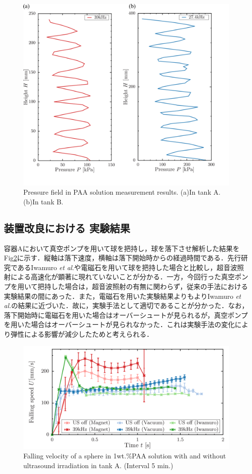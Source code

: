 \begin{figure}[ht]
    \centering
    \includegraphics[width=12cm,clip]{4-Results/press.png}
    \caption{Pressure field in PAA solution measurement results. (a)In tank A. (b)In tank B.}
    \label{fig:pressure}
\end{figure}

\newpage

\subsection{装置改良における 実験結果}

容器Aにおいて真空ポンプを用いて球を把持し，球を落下させ解析した結果をFig\ref{fig:falling-A}に示す．縦軸は落下速度，横軸は落下開始時からの経過時間である．先行研究であるIwamuro \textit{et al}.\cite{ref:8}や電磁石を用いて球を把持した場合と比較し，超音波照射による高速化が顕著に現れていないことが分かる．一方，今回行った真空ポンプを用いて把持した場合は，超音波照射の有無に関わらず，従来の手法における実験結果の間にあった．また，電磁石を用いた実験結果よりもよりIwamuro \textit{et al.}\cite{ref:8}の結果に近づいた．故に，実験手法として適切であることが分かった．なお，落下開始時に電磁石を用いた場合はオーバーシュートが見られるが，真空ポンプを用いた場合はオーバーシュートが見られなかった．これは実験手法の変化により弾性による影響が減少したためと考えられる．

\begin{figure}[ht]
    \centering
    \includegraphics[width=12cm,clip]{./4-Results/s1-A.png}
    \caption{Falling velocity of a sphere in 1wt.\%PAA solution with and without ultrasound irradiation in tank A. (Interval 5 min.)}
    \label{fig:falling-A}
\end{figure}

